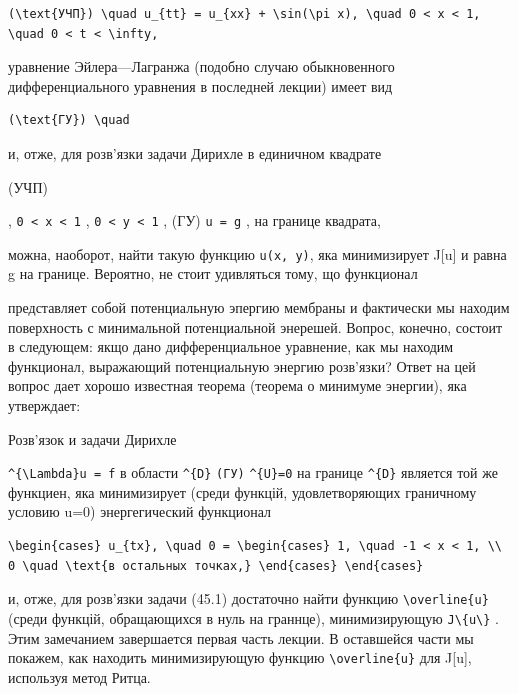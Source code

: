 \documentclass[
  ukrainian,
]{article}
\begin{document}
\begin{verbatim}
(\text{УЧП}) \quad u_{tt} = u_{xx} + \sin(\pi x), \quad 0 < x < 1, \quad 0 < t < \infty,
\end{verbatim}

уравнение Эйлера---Лагранжа (подобно случаю обыкновенного
дифференциального уравнения в последней лекции) имеет вид

\begin{verbatim}
(\text{ГУ}) \quad
\end{verbatim}

и, отже, для розв'язки задачи Дирихле в единичном квадрате

(УЧП)

, \texttt{0\ \textless{}\ x\ \textless{}\ 1} ,
\texttt{0\ \textless{}\ y\ \textless{}\ 1} , (ГУ) \texttt{u\ =\ g} , на
границе квадрата,

можна, наоборот, найти такую функцию \texttt{u(x,\ y)}, яка минимизирует
J{[}u{]} и равна g на границе. Вероятно, не стоит удивляться тому, що
функционал

представляет собой потенциальную эпергию мембраны и фактически мы
находим поверхность с минимальной потенциальной энерешей. Вопрос,
конечно, состоит в следующем: якщо дано дифференциальное уравнение, как
мы находим функционал, выражающий потенциальную энергию розв'язки? Ответ
на цей вопрос дает хорошо известная теорема (теорема о минимуме
энергии), яка утверждает:

Розв'язок и задачи Дирихле

\texttt{\^{}\{\textbackslash{}Lambda\}u\ =\ f} в области
\texttt{\^{}\{D\}} \texttt{(ГУ)} \texttt{\^{}\{U\}=0} на границе
\texttt{\^{}\{D\}} является той же функциен, яка минимизирует (среди
функцій, удовлетворяющих граничному условию u=0) энергегический
функционал

\begin{verbatim}
\begin{cases} u_{tx}, \quad 0 = \begin{cases} 1, \quad -1 < x < 1, \\ 0 \quad \text{в остальных точках,} \end{cases} \end{cases}
\end{verbatim}

и, отже, для розв'язки задачи (45.1) достаточно найти функцию
\texttt{\textbackslash{}overline\{u\}} (среди функцій, обращающихся в
нуль на граннце), минимизирующую
\texttt{J\textbackslash{}\{u\textbackslash{}\}} . Этим замечанием
завершается первая часть лекции. В оставшейся части мы покажем, как
находить минимизирующую функцию \texttt{\textbackslash{}overline\{u\}}
для J{[}u{]}, используя метод Ритца.
\end{document}
